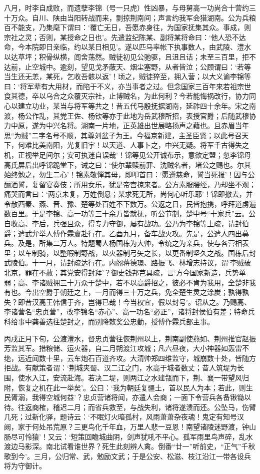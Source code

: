 \documentclass[]{article}
\begin{document}
八月，时李自成败，而遗孽李锦（号一只虎）性凶暴，与母舅高一功尚合十营约三十万众。自川、陕由当阳转战而来，剽掠荆南间；声言约我军会猎湖南。公为兵粮百不能支，乃集麾下谓曰：`覆亡无日，吾愿赤身往，为国家抚集其众。事成，则宗社之灵；否则，某授命之日也'。先遣监纪陈某、副将某将命曰：`他人恐不达命，今本院即日亲临，约以某日相见'。遂以匹马率帐下执事数人，由武陵、澧水以达草坪；积骨纵横，闾舍荡然。贼徒初见公驰驱，且沮且诘；未至三百里，拒不达前，止空城中。逾刻，望见戈矛蔽天、烟尘塞野，从者皆泣；公顾谓曰：`若等当生还无恙，某死，乞收吾骸以返'！顷之，贼徒猝至，拥入营；以大义谕李锦等曰：`将军辈有大用材，而陷于不义，亦当事者之过。但念国家三百年来若祖宗世食其德，卒以乌合之众覆灭宗社，止博贼名，为此何利？今若能悔祸改行，协力同心以建立功业，某当与将军等共之！昔五代马殷抚据湖南，延祚四十余年。宋之南渡，杨公作乱，其党王佐、杨钦等亦于此地为岳武穆所招，表授官爵；后随武穆协力中原，遂为中兴名将。湖南一片地，正英雄出世展略扬声之藉也。且赤眉当年思``为贼''二字名号不顺，其尊刘盆子为王。今福京新建，主圣臣贤；以此号召天下，何难比美南阳，光复旧宇！以天道、人事卜之，中兴无疑。将军千古得失之机，正视举足间尔；安可执迷自误哉'！锦等见公开诚布示，意欲定盟；忽李锦母高氏屏后出呼锦跪堂下，诫之曰：`使尔辈赎前罪、洗贼名者，堵公之赐也。尔其始终勉之，勿生二心'！锦素敬惮其母，即叩首曰：`愿遵慈命，誓当死报'！因与公酾酒誓，复留宴奏伎；所用女乐，犹是帝宫掠来者。公方素服腰绖，乃却坐不观；痛哭而言曰：`两京未复，万姓倒悬；某求死无所，尚何心听乐耶'！锦即撤去，并令散西秦、燕、晋、豫、楚等处百姓不下数万。公返之日，民皆抱携，呼拜道虏遍数百里。于是李锦、高一功等三十余万皆就抚，听公节制，楚中号``十家兵''云。公自收高、李后，兵强且众，得专力守御，屡有战功。公乃为李锦等上疏，请封伯爵；遣武弁举人傅作霖齎赴行在。乙酉九月，备车战火攻。先是，公遣人四出募兵。及是，所集二万人。特题蜀人杨国栋为大帅，令统之为亲兵，使与各营相表里；以车制骑，以整暇制野战，以火器制弓矢之长，以更番制坚久之战。国栋后封武陵伯。十一月，请封疏达行在。内阁蒋德璟、路振飞、林增志持议，谓`李贼破北京，罪在不赦；其党安得封拜'？御史钱邦芑具疏，言`方今国家新造，兵势单弱；高、李诸贼拥三十万众于楚中，若不以高爵招之，彼必不肯为我用，全楚非我有也。今出空爵于朝廷之上，一月而得三十万之兵，免全楚生灵之涂炭；孰得孰失？即昔汉高王韩信于齐，岂得已哉！今当权宜，假以封号'。诏从之。乃赐高、李诸营名``忠贞营''，改李锦名``赤心''、高一功名``必正''，诸将封侯伯有差；特命兵科给事中龚善选往楚封之，而别降敕奖公忠勤，授傅作霖兵部主事。

丙戌正月下旬，公渡澧水，督忠贞营往恢荆州以上，荆南副使燕如、荆州推官赵振芳监其军。措粮储、运火器，自二月朔渡江攻城；凡六昼夜，大小神器如轰雷不绝，远近闻数十里，云车炮石百道齐攻。大清帅郑四维监守，城崩数十处，皆随方拒战。有献策者谓：`荆城夹蜀、汉二江之门，水高于城者数丈；昔人筑堤为长围，使水入江，安流赴海。若决二堤，则两江之水建瓴而下，荆、襄一带望风归附，恢复之机在此一举矣'。公曰：`我为朝廷复疆土，首以民人为本；若此，则生民胥溺，我得空城何益'？忠贞营诸将闻，亦遣人会商；一面下令营兵各备锹锄以待。往返商榷，稽迟二月；而省兵救至，与战失利，诸将遂溃而还。公坠马，伤臂几死；过新化驿，题诗云：`不眠灯火暗孤村，风雨萧萧杂夜魂！鬼定有知号汉阙，家于何处吊荒原？三更鸟化千年血，万里人悲一豆恩！南望诸陵迷野渡，钟山肠尽可怜猿'！又云：`短策回瞻城曲阴，剑声犹吼不平心。孤军雨里鸟声碎，乱水渡边马影深。南北试看谁世界？死生此刻辨人禽。倒番``廿一''听前史，``正气''千秋歌到今'。三月，公归常、武，勉励文武；于是公安、松滋、枝江沿江一带各设兵将为守御计。
\end{document}
